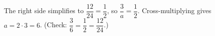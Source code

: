 The right side simplifies to $\dfrac{12}{24}=\dfrac{1}{2}$, so $\dfrac{3}{a}=\dfrac{1}{2}$. Cross-multiplying gives $a=2\cdot3=\boxed{6}$. (Check: $\dfrac{3}{6}=\dfrac{1}{2}=\dfrac{12}{24}$.)
